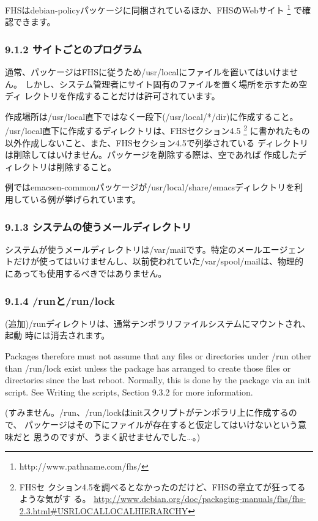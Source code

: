 \documentclass[mingoth,a4paper]{jsarticle}
\begin{document}
FHSはdebian-policyパッケージに同梱されているほか、FHSのWebサイト
\footnote{http://www.pathname.com/fhs/} で確認できます。

\subsubsection{9.1.2 サイトごとのプログラム}

通常、パッケージはFHSに従うため/usr/localにファイルを置いてはいけません。
しかし、システム管理者にサイト固有のファイルを置く場所を示すため空ディ
レクトリを作成することだけは許可されています。

作成場所は/usr/local直下ではなく一段下(/usr/local/*/dir)に作成すること。
/usr/local直下に作成するディレクトリは、FHSセクション4.5 \footnote{FHSセ
クション4.5を調べるとなかったのだけど、FHSの章立てが狂ってるような気がす
る。
\url{http://www.debian.org/doc/packaging-manuals/fhs/fhs-2.3.html\#USRLOCALLOCALHIERARCHY}}
に書かれたもの以外作成しないこと、また、FHSセクション4.5で列挙されている
ディレクトリは削除してはいけません。パッケージを削除する際は、空であれば
作成したディレクトリは削除すること。

例ではemacsen-commonパッケージが/usr/local/share/emacsディレクトリを利
用している例が挙げられています。

\subsubsection{9.1.3 システムの使うメールディレクトリ}

システムが使うメールディレクトリは/var/mailです。特定のメールエージェン
トだけが使ってはいけませんし、以前使われていた/var/spool/mailは、物理的
にあっても使用するべきではありません。

\subsubsection{9.1.4 /runと/run/lock}

(追加)/runディレクトリは、通常テンポラリファイルシステムにマウントされ、起動
時には消去されます。

Packages therefore must not assume that any files or directories under
/run other than /run/lock exist unless the package has arranged to
create those files or directories since the last reboot.
Normally, this is done by the package via an init script.
See Writing the scripts, Section 9.3.2 for more information.

(すみません。/run、/run/lockはinitスクリプトがテンポラリ上に作成するので、
パッケージはその下にファイルが存在すると仮定してはいけないという意味だと
思うのですが、うまく訳せませんでした…。)
\end{document}
